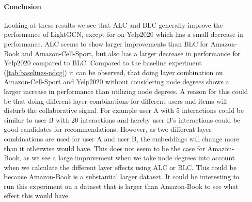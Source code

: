 \paragraph{Conclusion}
Looking at these results we see that ALC and BLC generally improve the performance of LightGCN, except for on Yelp2020 which has a small decrease in performance.
ALC seems to show larger improvements than BLC for Amazon-Book and Amazon-Cell-Sport, but also has a larger decrease in performance for Yelp2020 compared to BLC.
Compared to the baseline experiment (\autoref{tab:baselines-ndcg}) it can be observed, that doing layer combination on Amazon-Cell-Sport and Yelp2020 without considering node degrees shows a larger increase in performance than utilizing node degrees.
A reason for this could be that doing different layer combinations for different users and items will disturb the collaborative signal.
For example user A with 5 interactions could be similar to user B with 20 interactions and hereby user B's interactions could be good candidates for recommendations.
However, as two different layer combinations are used for user A and user B, the embeddings will change more than it otherwise would have.
This does not seem to be the case for Amazon-Book, as we see a large improvement when we take node degrees into account when we calculate the different layer effects using ALC or BLC.
This could be because Amazon-Book is a substantial larger dataset. 
It could be interesting to run this experiment on a dataset that is larger than Amazon-Book to see what effect this would have.
